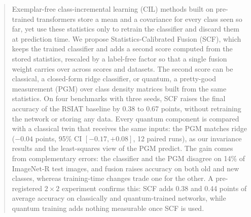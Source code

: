 \begin{abstract}
Exemplar-free class-incremental learning (CIL) methods built on pre-trained transformers store a mean and a
covariance for every class seen so far, yet use these statistics only to retrain the classifier and discard them
at prediction time. We propose Statistics-Calibrated Fusion (SCF), which keeps the trained classifier and adds a
second score computed from the stored statistics, rescaled by a label-free factor so that a single fusion weight
carries over across scores and datasets. The second score can be classical, a closed-form ridge classifier, or
quantum, a pretty-good measurement (PGM) over class density matrices built from the same statistics. On four
benchmarks with three seeds, SCF raises the final accuracy of the RSIAT baseline by 0.38 to 0.67 points, without
retraining the network or storing any data. Every quantum component is compared with a classical twin that
receives the same inputs: the PGM matches ridge ($-0.04$ points, 95\% CI $[-0.17,+0.08]$, 12 paired runs), as our
invariance results and the least-squares view of the PGM predict. The gain comes from complementary errors: the
classifier and the PGM disagree on 14\% of ImageNet-R test images, and fusion raises accuracy on both old and new classes, whereas
training-time changes trade one for the other. A pre-registered $2\times2$ experiment confirms this: SCF adds 0.38
and 0.44 points of average accuracy on classically and quantum-trained networks, while quantum training adds
nothing measurable once SCF is used.
\end{abstract}
